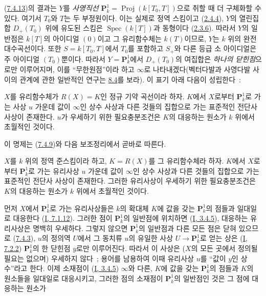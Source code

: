 \begin{env}[7.4.14]
\label{II.7.4.14-ko}
(\hyperref[II.7.4.13-ko]{7.4.13})의 결과는 $Y$를 \emph{사영직선}
$\mathbf{P}_k^1=\operatorname{Proj}(k[T_0,T])$으로 취할 때 더 구체화할 수
있다. 여기서 $T_0$와 $T$는 두 부정원이다. 이는 실제로 정역 스킴이고
(\hyperref[II.2.4.4-ko]{2.4.4}), $Y$의 열린집합 $D_+(T_0)$ 위에 유도된
스킴은 $\operatorname{Spec}(k[T])$과 동형이다
(\hyperref[II.2.3.6-ko]{2.3.6}). 따라서 $Y$의 일반점은 $k[T]$의
아이디얼 $(0)$이고 그 유리함수체는 $k(T)$이므로, $Y$는 $k$ 위의 완전
대수곡선이다. 또한 $S=k[T_0,T]$에서 $T_0$를 포함하고 $S_+$와 다른
등급 소 아이디얼은 주 아이디얼 $(T_0)$뿐이다. 따라서
$Y=\mathbf{P}_k^1$에서 $D_+(T_0)$의 여집합은 \emph{하나의 닫힌점}으로만
이루어지며, 이를 ``무한원점''이라 하고 $\infty$로 나타내겠다(벡터다발과
사영다발 사이의 관계에 관한 일반적인 연구는
\hyperref[subsection:II.8.4-ko]{8.4}를 보라). 이 표기 아래 다음이
성립한다~:
\end{env}

\begin{corollary}[7.4.15]
\label{II.7.4.15-ko}
$X$를 유리함수체가 $R(X)=K$인 정규 기약 곡선이라 하자. $K$에서
$X$로부터 $\mathbf{P}_k^1$로 가는 사상 $u$ 가운데 값이 $\infty$인
상수 사상과 다른 것들의 집합으로 가는 표준적인 전단사 사상이 존재한다.
$u$가 우세하기 위한 필요충분조건은 $K$의 대응하는 원소가 $k$ 위에서
초월적인 것이다.
\end{corollary}

이 명제는 (\hyperref[II.7.4.9-ko]{7.4.9})와 다음 보조정리에서 곧바로
따른다.

\begin{lemma}[7.4.15.1]
\label{II.7.4.15.1-ko}
$X$를 $k$ 위의 정역 준스킴이라 하고, $K=R(X)$를 그 유리함수체라 하자.
$K$에서 $X$로부터 $\mathbf{P}_k^1$로 가는 유리사상 $u$ 가운데 값이
$\infty$인 상수 사상과 다른 것들의 집합으로 가는 표준적인 전단사 사상이
존재한다. 그러한 유리사상이 우세하기 위한 필요충분조건은 $K$의 대응하는
원소가 $k$ 위에서 초월적인 것이다.
\end{lemma}

먼저 $X$에서 $\mathbf{P}_k^1$로 가는 유리사상들은 $k$의 확대체 $K$에
값을 갖는 $\mathbf{P}_k^1$의 점들과 일대일로 대응한다
(\hyperref[I.7.1.12-ko]{I, 7.1.12}). 그러한 점이 $\mathbf{P}_k^1$의
일반점에 위치하면
(\hyperref[I.3.4.5-ko]{I, 3.4.5}), 대응하는 유리사상은 명백히
우세하다. 그렇지 않으면 $\mathbf{P}_k^1$의 일반점과 다른 모든 점은
닫혀 있으므로 (\hyperref[II.7.4.3-ko]{7.4.3}), $u$의 정의역 $U$에서
그 동치류 $u$의 유일한 사상 $U\to\mathbf{P}_k^1$로 얻는 상은
(\hyperref[I.7.2.2-ko]{I, 7.2.2}) $\mathbf{P}_k^1$의 한 닫힌점 $y$로만
이루어진다. 따라서 이 사상은 ($X$의 모든 곳에서 정의될 필요는 없으며)
우세하지 않다~; 용어를 남용하여 이때 유리사상 $u$를 ``값이 $y$인
상수''라고 한다. 이제 소재점이
(\hyperref[I.3.4.5-ko]{I, 3.4.5}) $\infty$와 다른, $K$에 값을 갖는
$\mathbf{P}_k^1$의 점들과 $K$의 원소들을 일대일로 대응시키고, 그러한
점의 소재점이 $\mathbf{P}_k^1$의 일반점인 것은 그 점에 대응하는 원소가

